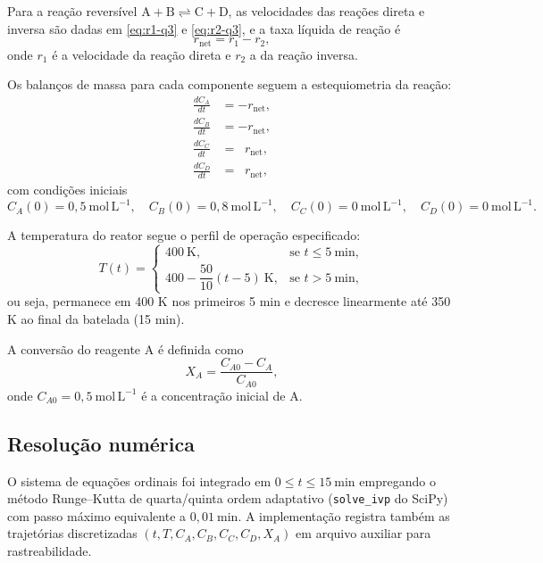 \documentclass{article}
\begin{document}
Para a reação reversível $\mathrm{A} + \mathrm{B} \rightleftharpoons \mathrm{C} + \mathrm{D}$, as velocidades das reações direta e inversa são dadas em \eqref{eq:r1-q3} e \eqref{eq:r2-q3}, e a taxa líquida de reação é
\begin{equation}
  r_{\text{net}} = r_1 - r_2, \label{eq:rnet-q3}
\end{equation}
onde $r_1$ é a velocidade da reação direta e $r_2$ a da reação inversa.

Os balanços de massa para cada componente seguem a estequiometria da reação:
\begin{align}
  \frac{dC_A}{dt} &= -r_{\text{net}}, \label{eq:balanco-A-q3} \\
  \frac{dC_B}{dt} &= -r_{\text{net}}, \label{eq:balanco-B-q3} \\
  \frac{dC_C}{dt} &= \;\;r_{\text{net}}, \label{eq:balanco-C-q3} \\
  \frac{dC_D}{dt} &= \;\;r_{\text{net}}, \label{eq:balanco-D-q3}
\end{align}
com condições iniciais
\begin{equation*}
  C_A(0) = 0{,}5\ \mathrm{mol\,L^{-1}}, \quad
  C_B(0) = 0{,}8\ \mathrm{mol\,L^{-1}}, \quad
  C_C(0) = 0\ \mathrm{mol\,L^{-1}}, \quad
  C_D(0) = 0\ \mathrm{mol\,L^{-1}}.
\end{equation*}

A temperatura do reator segue o perfil de operação especificado:
\begin{equation}
  T(t) = \begin{cases}
    400\ \mathrm{K}, & \text{se } t \leq 5\ \mathrm{min}, \\
    400 - \dfrac{50}{10}(t - 5)\ \mathrm{K}, & \text{se } t > 5\ \mathrm{min},
  \end{cases}
  \label{eq:temperatura-q3}
\end{equation}
ou seja, permanece em 400 K nos primeiros 5 min e decresce linearmente até 350 K ao final da batelada (15 min).

A conversão do reagente A é definida como
\begin{equation}
  X_A = \frac{C_{A0} - C_A}{C_{A0}}, \label{eq:conversao-q3}
\end{equation}
onde $C_{A0} = 0{,}5\ \mathrm{mol\,L^{-1}}$ é a concentração inicial de A.

\subsection*{Resolução numérica}
O sistema de equações ordinais foi integrado em $0 \leq t \leq 15\ \mathrm{min}$ empregando o método Runge--Kutta de quarta/quinta ordem adaptativo (\texttt{solve\_ivp} do SciPy) com passo máximo equivalente a $0{,}01\ \mathrm{min}$. A implementação registra também as trajetórias discretizadas $(t, T, C_A, C_B, C_C, C_D, X_A)$ em arquivo auxiliar para rastreabilidade.
\end{document}
